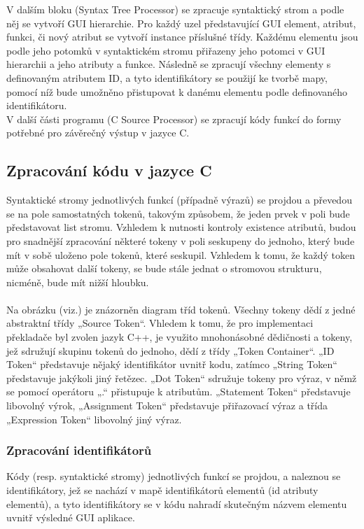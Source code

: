 \documentclass[report,11pt]{elsarticle}
\begin{document}
V dalším bloku (Syntax Tree Processor) se zpracuje syntaktický strom a podle něj se vytvoří GUI hierarchie. Pro každý uzel představující GUI element, atribut, funkci, či nový atribut se vytvoří instance příslušné třídy. Každému elementu jsou podle jeho potomků v syntaktickém stromu přiřazeny jeho potomci v GUI hierarchii a jeho atributy a funkce.
Následně se zpracují všechny elementy s definovaným atributem ID, a tyto identifikátory se použijí ke tvorbě mapy, pomocí níž bude umožněno přistupovat k danému elementu podle definovaného identifikátoru.\\
V další části programu (C Source Processor) se zpracují kódy funkcí do formy potřebné pro závěrečný výstup v jazyce C. 

\subsection{\label{SEC:Intro}Zpracování kódu v jazyce C}
Syntaktické stromy jednotlivých funkcí (případně výrazů) se projdou a převedou se na pole samostatných tokenů, takovým způsobem, že jeden prvek v poli bude představovat list stromu. Vzhledem k nutnosti kontroly existence atributů, budou pro snadnější zpracování některé tokeny v poli seskupeny do jednoho, který bude mít v sobě uloženo pole tokenů, které seskupil. Vzhledem k tomu, že každý token může obsahovat další tokeny, se bude stále jednat o stromovou strukturu, nicméně, bude mít nižší hloubku.\\
\\
Na obrázku (viz.) je znázorněn diagram tříd tokenů. Všechny tokeny dědí z jedné abstraktní třídy „Source Token“. Vhledem k tomu, že pro implementaci překladače byl zvolen jazyk C++, je využito mnohonásobné dědičnosti a tokeny, jež sdružují skupinu tokenů do jednoho, dědí z třídy „Token Container“. „ID Token“ představuje nějaký identifikátor uvnitř kodu, zatímco „String Token“ představuje jakýkoli jiný řetězec. „Dot Token“ sdružuje tokeny pro výraz, v němž se pomocí operátoru „.“ přistupuje k atributům. „Statement Token“ představuje libovolný výrok, „Assignment Token“ představuje přiřazovací výraz a třída „Expression Token“ libovolný jiný výraz.

\subsubsection{\label{SEC:Intro}Zpracování identifikátorů}
Kódy (resp. syntaktické stromy) jednotlivých funkcí se projdou, a naleznou se identifikátory, jež se nachází v mapě identifikátorů elementů (id atributy elementů), a tyto identifikátory se v kódu nahradí skutečným názvem elementu uvnitř výsledné GUI aplikace.
\end{document}
